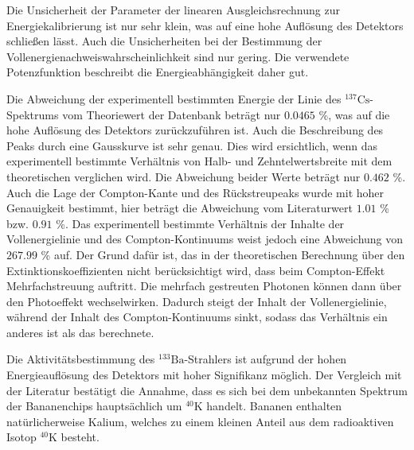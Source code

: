 Die Unsicherheit der Parameter der linearen Ausgleichsrechnung zur Energiekalibrierung ist nur sehr klein, 
was auf eine hohe Auflösung des Detektors schließen lässt. Auch die Unsicherheiten bei der Bestimmung der Vollenergienachweiswahrscheinlichkeit 
sind nur gering. Die verwendete Potenzfunktion beschreibt die Energieabhängigkeit daher gut.

Die Abweichung der experimentell bestimmten Energie der Linie des $^{137}\text{Cs}$-Spektrums
vom Theoriewert der Datenbank \cite{Datenbank} beträgt nur $\num{0.0465}$ \%, was auf die hohe Auflösung des Detektors 
zurückzuführen ist. 
Auch die Beschreibung des Peaks durch eine Gausskurve ist sehr genau. Dies wird ersichtlich, wenn das 
experimentell bestimmte Verhältnis von Halb- und Zehntelwertsbreite mit dem theoretischen verglichen wird. 
Die Abweichung beider Werte beträgt nur $\num{0.462}$ \%.
Auch die Lage der Compton-Kante und des Rückstreupeaks wurde mit hoher Genauigkeit bestimmt, hier beträgt
die Abweichung vom Literaturwert $\num{1.01}$ \% bzw. $\num{0.91}$ \%.
Das experimentell bestimmte Verhältnis der Inhalte der Vollenergielinie und des Compton-Kontinuums 
weist jedoch eine Abweichung von $\num{267.99}$ \% auf. Der Grund dafür ist, das in der theoretischen Berechnung über den 
Extinktionskoeffizienten nicht berücksichtigt wird, dass beim Compton-Effekt Mehrfachstreuung 
auftritt. Die mehrfach gestreuten Photonen können dann über den Photoeffekt wechselwirken.
Dadurch steigt der Inhalt der Vollenergielinie, während der Inhalt des Compton-Kontinuums sinkt, sodass das 
Verhältnis ein anderes ist als das berechnete.  

Die Aktivitätsbestimmung des $^{133}\text{Ba}$-Strahlers ist aufgrund der hohen Energieauflösung des Detektors mit hoher Signifikanz möglich.
Der Vergleich mit der Literatur \cite{Bundesamt} bestätigt die Annahme, dass es sich bei dem unbekannten Spektrum der Bananenchips 
hauptsächlich um $^{40}\text{K}$ handelt. Bananen enthalten natürlicherweise Kalium, welches zu einem kleinen Anteil 
aus dem radioaktiven Isotop $^{40}\text{K}$ besteht.

\nocite{wingate}
\nocite{*}
\printbibliography


